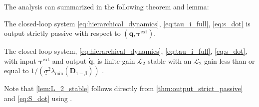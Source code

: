 \documentclass[../main.tex]{subfiles}
\begin{document}
The analysis can summarized in the following theorem and lemma:
\begin{theorem} \label{thm:output_strict_passive}
    The closed-loop system \eqref{eq:hierarchical_dynamics}, \eqref{eq:tau_i_full}, \eqref{eq:s_dot} is output strictly passive with respect to $(\dot{\bm{q}},\bm{\tau}^\mathrm{ext})$.
\end{theorem}
\begin{lemma} \label{lem:L_2_stable}
    The closed-loop system, \eqref{eq:hierarchical_dynamics}, \eqref{eq:tau_i_full}, \eqref{eq:s_dot}, with input $\bm{\tau}^\mathrm{ext}$ and output $\dot{\bm{q}}$, is finite-gain $\mathcal{L}_2$ stable with an $\mathcal{L}_2$ gain less than or equal to %
    $1/(\underline{\sigma}^2 \lambda_\mathrm{min}(\bm{D}_{1-\beta}))$
    . 
\end{lemma}


Note that \cref{lem:L_2_stable} follows directly from \cref{thm:output_strict_passive} and \eqref{eq:S_dot} using \cite[Lem.~6.5]{khalil2002nonlinear}.
\end{document}
